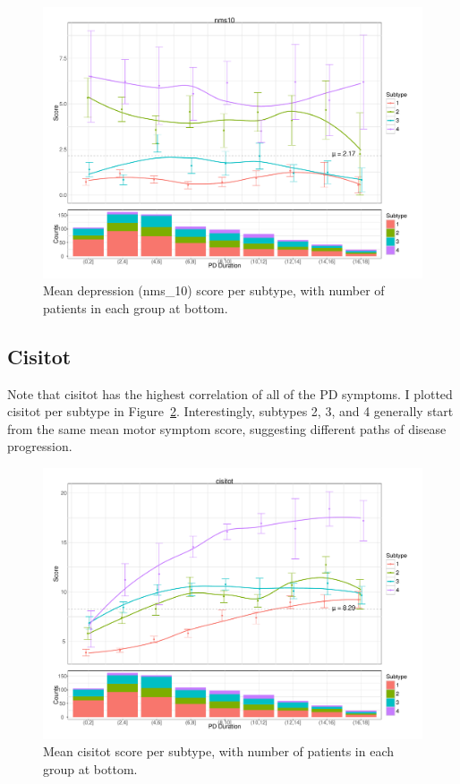 \documentclass[10pt]{article}
\begin{document}
\begin{multicols}{2}
\begin{figure}[p]
  \centering
  \includegraphics[width=0.8\linewidth]{nms10-multi-durat-counts.pdf}
  \caption{Mean depression (nms\_10) score per subtype, with number of patients in each group at
  bottom.}
  \label{fig:nms10-multi}
\end{figure}

\subsection{Cisitot}

Note that cisitot has the highest correlation of all of the PD symptoms. I plotted cisitot per
subtype in Figure~\ref{fig:cisitot-multi}. Interestingly, subtypes 2, 3, and 4 generally start from
the same mean motor symptom score, suggesting different paths of disease progression.

\begin{figure}[t]
  \centering
  \includegraphics[width=0.8\linewidth]{cisitot-multi-durat-counts.pdf}
  \caption{Mean cisitot score per subtype, with number of patients in each group at
  bottom.}
  \label{fig:cisitot-multi}
\end{figure}


\end{multicols}
\end{document}
